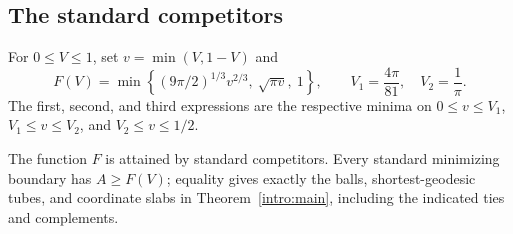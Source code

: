 \subsection{The standard competitors}

For \(0\le V\le1\), set \(v=\min(V,1-V)\) and
\begin{equation}
 F(V)=\min\left\{
       (9\pi/2)^{1/3}v^{2/3},\ \sqrt{\pi v},\ 1
       \right\},
 \qquad V_1=\frac{4\pi}{81},\quad V_2=\frac1\pi.
 \label{pre:envelope}
\end{equation}
The first, second, and third expressions are the respective minima on
\(0\le v\le V_1\), \(V_1\le v\le V_2\), and \(V_2\le v\le1/2\).

\begin{lemma}\label{pre:standard}
The function \(F\) is attained by standard competitors. Every standard
minimizing boundary has \(A\ge F(V)\); equality gives exactly the balls,
shortest-geodesic tubes, and coordinate slabs in
Theorem~\ref{intro:main}, including the indicated ties and complements.
\end{lemma}

